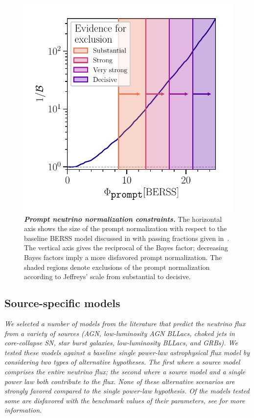 \begin{figure}
	\centering
	\includegraphics[width=\linewidth]{figures/hese_paper/prompt_bayes}
	\internallinenumbers
	\caption{\textbf{\textit{Prompt neutrino normalization constraints.}}
		The horizontal axis shows the size of the prompt normalization with respect to the baseline BERSS model discussed in  with passing fractions given in~\cite{Arguelles:2018awr}.
		The vertical axis gives the reciprocal of the Bayes factor; decreasing Bayes factors imply a more disfavored prompt normalization.
		The shaded regions denote exclusions of the prompt normalization according to Jeffreys' scale from substantial to decisive.}\label{fig:prompt_bayes}
\end{figure}

\subsection{Source-specific models\label{sec:specific_models}}

\noindent
\textit{We selected a number of models from the literature that predict the neutrino flux from a variety of sources (AGN, low-luminosity AGN BLLacs, choked jets in core-collapse SN, star burst galaxies, low-luminosity BLLacs, and GRBs).
	We tested these models against a baseline single power-law astrophysical flux model by considering two types of alternative hypotheses.
	The first where a source model comprises the entire neutrino flux; the second where a source model and a single power law both contribute to the flux.
	None of these alternative scenarios are strongly favored compared to the single power-law hypothesis.
	Of the models tested some are disfavored with the benchmark values of their parameters, see  for more information.
}
\newline

